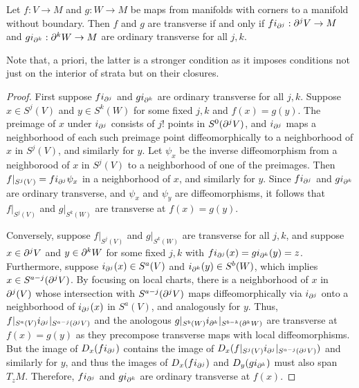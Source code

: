 \begin{lemma}\label{L: simple trans}
Let $f:V\to M$ and $g:W\to M$ be maps from manifolds with corners to a manifold without boundary. Then $f$ and $g$ are transverse if and only if $fi_{\partial^j}:\partial^jV\to M$ and  $gi_{\partial^k}:\partial^kW \to M$ are ordinary transverse for all $j,k$.
\end{lemma}
Note that, a priori, the latter is a stronger condition as it imposes conditions not just on the interior of strata but on their closures.
\begin{proof}


First suppose $fi_{\partial^j }$ and  $gi_{\partial^k }$ are ordinary transverse for all $j,k$. Suppose $x\in S^j(V)$ and $y\in S^k(W)$ for some fixed $j,k$  and $f(x)=g(y)$. The preimage of $x$ under $i_{\partial^j}$ consists of $j!$ points in $S^0(\partial^jV)$, and $i_{\partial^j}$ maps a neighborhood of each such preimage point diffeomorphically to a neighborhood of $x$ in $S^j(V)$, and similarly for $y$. Let $\psi_x$ be the inverse diffeomorphism from a neighborood of $x$ in $S^j(V)$ to a neighborhood of one of the preimages. Then $f|_{S^j(V)}=fi_{\partial^j}\psi_x$ in a neighborhood of $x$, and similarly for $y$.
Since $fi_{\partial^j }$ and  $gi_{\partial^k }$ are ordinary transverse, and $\psi_x$ and $\psi_y$ are diffeomorphisms, it follows that $f|_{S^j(V)}$ and $g|_{S^k(W)}$ are transverse at $f(x)=g(y)$.

Conversely, suppose $f|_{S^j(V)}$ and $g|_{S^k(W)}$ are transverse for all $j,k$, and suppose $x\in \partial^jV$ and $y\in \partial^kW$ for some fixed $j,k$ with $fi_{\partial^j}(x)=gi_{\partial^k}(y)=z$. Furthermore, suppose $i_{\partial^j}(x)\in S^a(V)$ and $i_{\partial^k}(y)\in S^b(W)$, which implies $x\in S^{a-j}(\partial^j V)$. By focusing on local charts, there is a neighborhood of $x$ in $\partial^j(V)$ whose intersection with $S^{a-j}(\partial^j V)$ maps  diffeomorphically via $i_{\partial^j}$ onto a neighborhood of $i_{\partial^j}(x)$ in $S^a(V)$, and analogously for $y$. Thus,  $f|_{S^a(V)}i_{\partial^j}|_{S^{a-j}(\partial^j V)}$ and the anologous $g|_{S^b(W)}i_{\partial^k}|_{S^{b-k}(\partial^k W)}$ are transverse at $f(x)=g(y)$ as they precompose transverse maps with local diffeomorphisms. But the image of $D_x(fi_{\partial^j})$ contains the image of $D_x(f|_{S^j(V)}i_{\partial^j}|_{S^{a-j}(\partial^j V)})$ and similarly for $y$, and thus the images of $D_x(fi_{\partial^j})$ and $D_y(gi_{\partial^k})$ must also span $T_{z}M$. Therefore, $fi_{\partial^j}$ and $gi_{\partial^k}$ are ordinary transverse at $f(x)$.
\end{proof}





